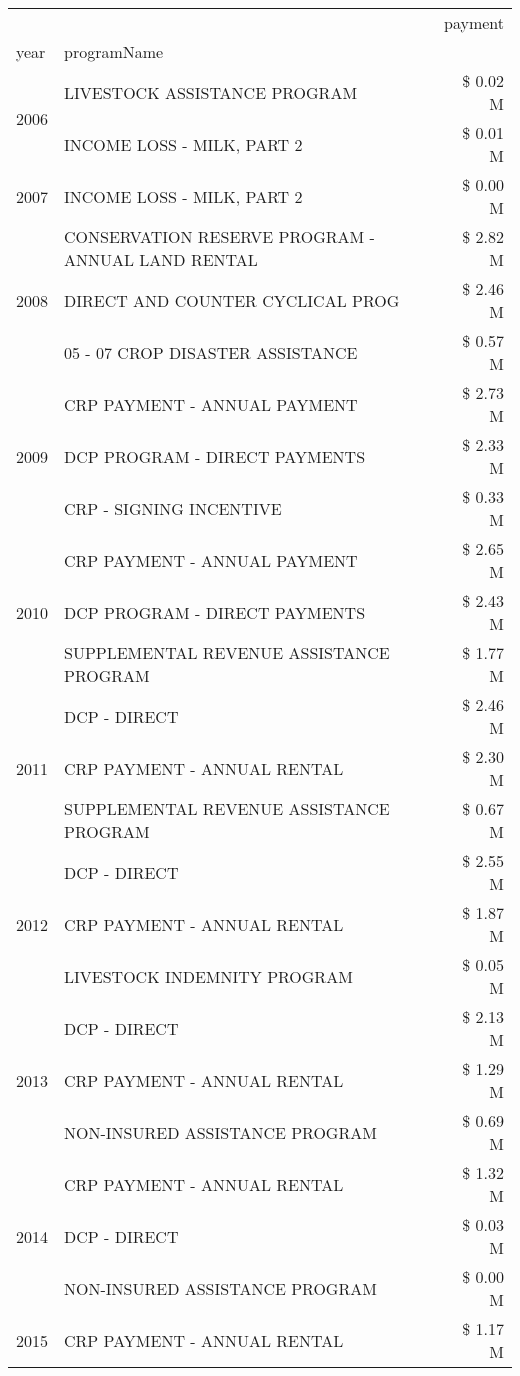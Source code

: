\begin{tabular}{llr}
\toprule
 &  & payment \\
year & programName &  \\
\midrule
\multirow[t]{2}{*}{2006} & LIVESTOCK ASSISTANCE PROGRAM & \$ 0.02 M \\
 & INCOME LOSS - MILK, PART 2 & \$ 0.01 M \\
\cline{1-3}
2007 & INCOME LOSS - MILK, PART 2 & \$ 0.00 M \\
\cline{1-3}
\multirow[t]{3}{*}{2008} & CONSERVATION RESERVE PROGRAM - ANNUAL LAND RENTAL & \$ 2.82 M \\
 & DIRECT AND COUNTER CYCLICAL PROG & \$ 2.46 M \\
 & 05 - 07 CROP DISASTER ASSISTANCE & \$ 0.57 M \\
\cline{1-3}
\multirow[t]{3}{*}{2009} & CRP PAYMENT - ANNUAL PAYMENT & \$ 2.73 M \\
 & DCP PROGRAM - DIRECT PAYMENTS & \$ 2.33 M \\
 & CRP - SIGNING INCENTIVE & \$ 0.33 M \\
\cline{1-3}
\multirow[t]{3}{*}{2010} & CRP PAYMENT - ANNUAL PAYMENT & \$ 2.65 M \\
 & DCP PROGRAM - DIRECT PAYMENTS & \$ 2.43 M \\
 & SUPPLEMENTAL REVENUE ASSISTANCE PROGRAM & \$ 1.77 M \\
\cline{1-3}
\multirow[t]{3}{*}{2011} & DCP - DIRECT & \$ 2.46 M \\
 & CRP PAYMENT - ANNUAL RENTAL & \$ 2.30 M \\
 & SUPPLEMENTAL REVENUE ASSISTANCE PROGRAM & \$ 0.67 M \\
\cline{1-3}
\multirow[t]{3}{*}{2012} & DCP - DIRECT & \$ 2.55 M \\
 & CRP PAYMENT - ANNUAL RENTAL & \$ 1.87 M \\
 & LIVESTOCK INDEMNITY PROGRAM & \$ 0.05 M \\
\cline{1-3}
\multirow[t]{3}{*}{2013} & DCP - DIRECT & \$ 2.13 M \\
 & CRP PAYMENT - ANNUAL RENTAL & \$ 1.29 M \\
 & NON-INSURED ASSISTANCE PROGRAM & \$ 0.69 M \\
\cline{1-3}
\multirow[t]{3}{*}{2014} & CRP PAYMENT - ANNUAL RENTAL & \$ 1.32 M \\
 & DCP - DIRECT & \$ 0.03 M \\
 & NON-INSURED ASSISTANCE PROGRAM & \$ 0.00 M \\
\cline{1-3}
\multirow[t]{3}{*}{2015} & CRP PAYMENT - ANNUAL RENTAL & \$ 1.17 M \\

\end{tabular}

